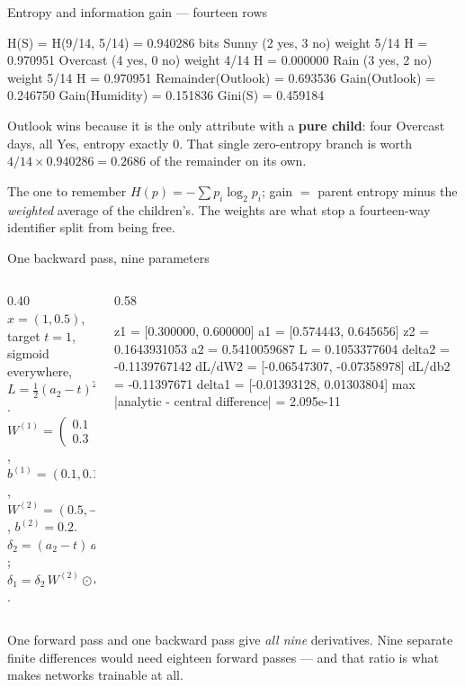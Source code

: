 \documentclass[aspectratio=169]{beamer}
\begin{document}
\begin{frame}[fragile,shrink=5]{Entropy and information gain --- fourteen rows}
\begin{outblk}
H(S) = H(9/14, 5/14) = 0.940286 bits
Sunny     (2 yes, 3 no)  weight 5/14  H = 0.970951
Overcast  (4 yes, 0 no)  weight 4/14  H = 0.000000
Rain      (3 yes, 2 no)  weight 5/14  H = 0.970951
Remainder(Outlook) = 0.693536   Gain(Outlook) = 0.246750
Gain(Humidity) = 0.151836       Gini(S) = 0.459184
\end{outblk}
  \begin{center}
    \small Outlook wins because it is the only attribute with a \textbf{pure
    child}: four Overcast days, all Yes, entropy exactly 0. That single
    zero-entropy branch is worth $4/14 \times 0.940286 = 0.2686$ of the
    remainder on its own.
  \end{center}
  \begin{alertblock}{The one to remember}
    $H(p) = -\sum p_i \log_2 p_i$; gain $=$ parent entropy minus the
    \emph{weighted} average of the children's. The weights are what stop a
    fourteen-way identifier split from being free.
  \end{alertblock}
\end{frame}

\begin{frame}[fragile,shrink=5]{One backward pass, nine parameters}
  \begin{columns}[T]
    \begin{column}{0.40\textwidth}
      \small
      $x = (1, 0.5)$, target $t = 1$, sigmoid everywhere,
      $L = \tfrac12 (a_2 - t)^2$.\\[0.3em]
      $W^{(1)} = \begin{pmatrix} 0.1 & 0.2 \\ 0.3 & 0.4 \end{pmatrix}$,
      $b^{(1)} = (0.1, 0.1)$,\\[0.3em]
      $W^{(2)} = (0.5, -0.5)$, $b^{(2)} = 0.2$.\\[0.4em]
      $\delta_2 = (a_2 - t)\,a_2(1-a_2)$;\\
      $\delta_1 = \delta_2\, W^{(2)} \odot a_1 \odot (1-a_1)$.
    \end{column}
    \begin{column}{0.58\textwidth}
\begin{outblk}
z1 = [0.300000, 0.600000]  a1 = [0.574443, 0.645656]
z2 = 0.1643931053  a2 = 0.5410059687  L = 0.1053377604
delta2 = -0.1139767142
dL/dW2 = [-0.06547307, -0.07358978]
dL/db2 = -0.11397671
delta1 = [-0.01393128, 0.01303804]
max |analytic - central difference| = 2.095e-11
\end{outblk}
    \end{column}
  \end{columns}
  \begin{center}
    \small One forward pass and one backward pass give \emph{all nine}
    derivatives. Nine separate finite differences would need eighteen forward
    passes --- and that ratio is what makes networks trainable at all.
  \end{center}
\end{frame}
\end{document}
